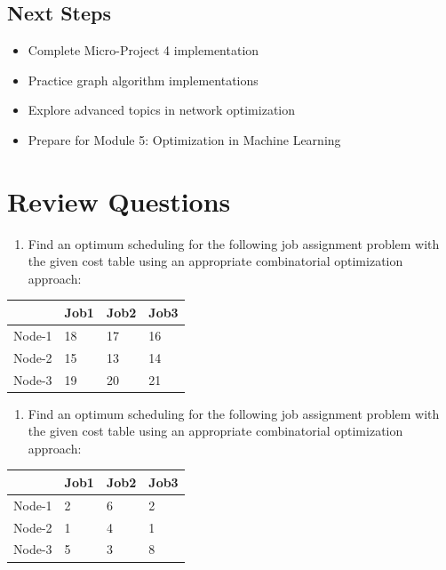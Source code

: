 \documentclass[
  letterpaper,
  DIV=11,
  numbers=noendperiod]{scrreprt}
\providecommand{\tightlist}{%
  \setlength{\itemsep}{0pt}\setlength{\parskip}{0pt}}
\begin{document}
\subsection{Next Steps}\label{next-steps-1}

\begin{itemize}
\tightlist
\item
  Complete Micro-Project 4 implementation
\item
  Practice graph algorithm implementations
\item
  Explore advanced topics in network optimization
\item
  Prepare for Module 5: Optimization in Machine Learning
\end{itemize}

\section{Review Questions}\label{review-questions-16}

\begin{enumerate}
\def\labelenumi{\arabic{enumi}.}
\tightlist
\item
  Find an optimum scheduling for the following job assignment problem
  with the given cost table using an appropriate combinatorial
  optimization approach:
\end{enumerate}

\begin{longtable}[]{@{}llll@{}}
\toprule\noalign{}
& Job1 & Job2 & Job3 \\
\midrule\noalign{}
\endhead
\bottomrule\noalign{}
\endlastfoot
Node-1 & 18 & 17 & 16 \\
Node-2 & 15 & 13 & 14 \\
Node-3 & 19 & 20 & 21 \\
\end{longtable}

\begin{enumerate}
\def\labelenumi{\arabic{enumi}.}
\setcounter{enumi}{1}
\tightlist
\item
  Find an optimum scheduling for the following job assignment problem
  with the given cost table using an appropriate combinatorial
  optimization approach:
\end{enumerate}

\begin{longtable}[]{@{}llll@{}}
\toprule\noalign{}
& Job1 & Job2 & Job3 \\
\midrule\noalign{}
\endhead
\bottomrule\noalign{}
\endlastfoot
Node-1 & 2 & 6 & 2 \\
Node-2 & 1 & 4 & 1 \\
Node-3 & 5 & 3 & 8 \\
\end{longtable}
\end{document}
